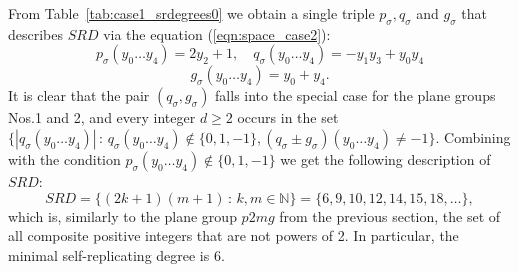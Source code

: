 
From Table~\ref{tab:case1_srdegrees0} we obtain a single triple $p_\sigma, q_\sigma$ and $g_\sigma$ that
describes $SRD$ via the equation (\ref{eqn:space_case2}):
\[
  p_\sigma(y_0 \dots y_4) = 2y_2 + 1,  \quad q_\sigma(y_0 \dots y_4) = -y_1 y_3 + y_0 y_4
\]
\[
  g_\sigma(y_0 \dots y_4) = y_0 + y_4.
\]
It is clear that the pair $(q_\sigma, g_\sigma)$ falls into the special case for the plane groups Nos.1 and 2, and every
integer $d \ge 2$ occurs in the set \\
$\{ | q_\sigma(y_0 \dots y_4) | \, : \, q_\sigma(y_0 \dots y_4) \notin \{0, 1, -1\}, (q_\sigma \pm g_\sigma)(y_0 \dots y_4) \neq -1 \}$.
Combining with the condition $p_\sigma(y_0 \dots y_4) \notin \{0, 1, -1 \}$ we get the following description of $SRD$:
$$
SRD = \{(2k + 1)(m + 1) \, : \, k,m \in \mathbb{N} \} = \{6, 9, 10, 12, 14, 15, 18, \dots \},
$$
which is, similarly to the plane group $p2mg$ from the previous section, the set of all composite positive integers that
are not powers of 2. In particular, the minimal self-replicating degree is 6.

